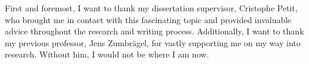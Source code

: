 
\begin{acknowledgements}
    First and foremost, I want to thank my dissertation supervisor, Cristophe Petit, who brought me in contact with this fascinating topic and provided invaluable advice throughout the research and writing process. 
    Additionally, I want to thank my previous professor, Jens Zumbrägel, for vastly supporting me on my way into research.
    Without him, I would not be where I am now.
\end{acknowledgements}